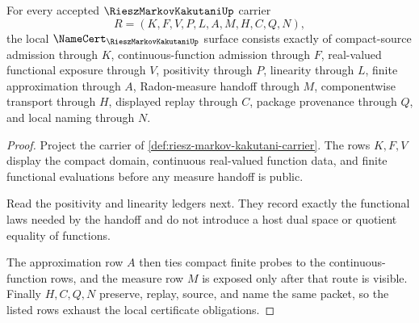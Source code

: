 \begin{theorem}
\label{thm:riesz-markov-kakutani-namecert-obligations}
For every accepted $\RieszMarkovKakutaniUp$ carrier
$$
R=(K,F,V,P,L,A,M,H,C,Q,N),
$$
the local $\NameCert_{\RieszMarkovKakutaniUp}$ surface consists exactly of compact-source admission through $K$, continuous-function admission through $F$, real-valued functional exposure through $V$, positivity through $P$, linearity through $L$, finite approximation through $A$, Radon-measure handoff through $M$, componentwise transport through $H$, displayed replay through $C$, package provenance through $Q$, and local naming through $N$.
\end{theorem}
\begin{proof}
Project the carrier of \autoref{def:riesz-markov-kakutani-carrier}. The rows $K,F,V$ display the compact domain, continuous real-valued function data, and finite functional evaluations before any measure handoff is public.

Read the positivity and linearity ledgers next. They record exactly the functional laws needed by the handoff and do not introduce a host dual space or quotient equality of functions.

The approximation row $A$ then ties compact finite probes to the continuous-function rows, and the measure row $M$ is exposed only after that route is visible. Finally $H,C,Q,N$ preserve, replay, source, and name the same packet, so the listed rows exhaust the local certificate obligations.
\end{proof}

